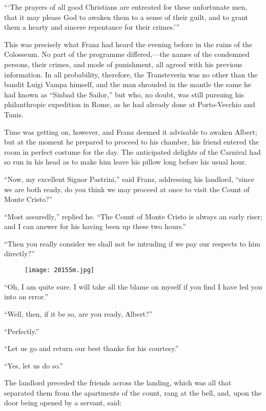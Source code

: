 “‘The prayers of all good Christians are entreated for these
unfortunate men, that it may please God to awaken them to a sense of
their guilt, and to grant them a hearty and sincere repentance for
their crimes.’”

This was precisely what Franz had heard the evening before in the ruins
of the Colosseum. No part of the programme differed,—the names of the
condemned persons, their crimes, and mode of punishment, all agreed
with his previous information. In all probability, therefore, the
Transteverin was no other than the bandit Luigi Vampa himself, and the
man shrouded in the mantle the same he had known as “Sinbad the
Sailor,” but who, no doubt, was still pursuing his philanthropic
expedition in Rome, as he had already done at Porto-Vecchio and Tunis.

Time was getting on, however, and Franz deemed it advisable to awaken
Albert; but at the moment he prepared to proceed to his chamber, his
friend entered the room in perfect costume for the day. The anticipated
delights of the Carnival had so run in his head as to make him leave
his pillow long before his usual hour.

“Now, my excellent Signor Pastrini,” said Franz, addressing his
landlord, “since we are both ready, do you think we may proceed at once
to visit the Count of Monte Cristo?”

“Most assuredly,” replied he. “The Count of Monte Cristo is always an
early riser; and I can answer for his having been up these two hours.”

“Then you really consider we shall not be intruding if we pay our
respects to him directly?”

\begin{figure}[h]
\texttt{[image: 20155m.jpg]}
\end{figure}

“Oh, I am quite sure. I will take all the blame on myself if you find I
have led you into an error.”

“Well, then, if it be so, are you ready, Albert?”

“Perfectly.”

“Let us go and return our best thanks for his courtesy.”

“Yes, let us do so.”

The landlord preceded the friends across the landing, which was all
that separated them from the apartments of the count, rang at the bell,
and, upon the door being opened by a servant, said:

